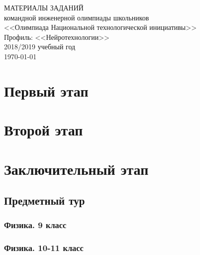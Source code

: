 \documentclass[a4paper,12pt,oneside]{book}
\begin{document}
\begin{titlepage}
    \begin{center}
        \huge{МАТЕРИАЛЫ ЗАДАНИЙ} \\
        \Large{командной инженерной олимпиады школьников} \\
        \Large{<<Олимпиада Национальной технологической инициативы>>} \\
        \Large{Профиль: <<Нейротехнологии>>} \\
        \large{2018/2019 учебный год} \\
        \vspace{2cm}
        \Large{\today}  
    \end{center}
\end{titlepage}

\setcounter{tocdepth}{1}

\tableofcontents

\part{Первый этап}




\part{Второй этап}



\part{Заключительный этап}

\clearpage
\chapter{Предметный тур}

\section{Физика. 9 класс}


\section{Физика. 10-11 класс}


%
%
\end{document}
